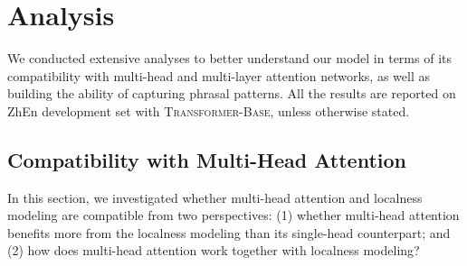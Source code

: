 \documentclass[11pt,a4paper]{article}
\begin{document}
\iffalse
We integrate the proposed model into \emph{Base} (\textsc{Transformer-Base}) and \emph{Big} model (\textsc{Transformer-Big}) to compare with the exsiting NMT systems on WMT17 Chinese-English and WMT14 English-German translation tasks, concluding in the Table~\ref{tab:exist}. The difference between the two set of models has been introduced in Section~\ref{sec:setup}. Experimental results demonstrate that the localness model outperforms either the baseline or the relative position encoding enhanced model (``Rel\_Pos''). Contrast with relative position encoding which only enhanced the neighbor information around the query, the proposed model provides more extensive spaces to locate the neighbouring scopes. In addition, through combining the localness model with the relative position encoding, our systems gain further improvements that achieving even comparable results with almost three times less parameters (108.8M/303.9M) against baseline of \emph{Big} model. This reveals that the two approach is able to complement each other.  Integrating the above achievements into the \emph{Big} model of \textsc{Transformer}, the proposed model achieves state-of-the-art results under the single model setting\footnote{The best single system reported in \cite{hassan2018achieving} is trained using additional 7M back-translation data and achieved 27.40 BLUE score. For a fair comparison, we did not refer to this result in the table.} on both Chinese-English and English-German translation tasks. 
\fi




\section{Analysis}

We conducted extensive analyses to better understand our model in terms of its compatibility with multi-head and multi-layer attention networks, as well as building the ability of capturing phrasal patterns. All the results are reported on ZhEn development set with \textsc{Transformer-Base}, unless otherwise stated.


\subsection{Compatibility with Multi-Head Attention}
\label{sec:multi-head}

In this section, we investigated whether multi-head attention and localness modeling are compatible from two perspectives: (1) whether multi-head attention benefits more from the localness modeling than its single-head counterpart; and (2) how does multi-head attention work together with localness modeling?
\end{document}
